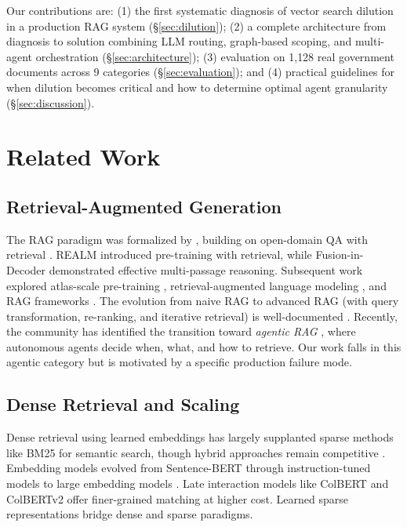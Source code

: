 \documentclass[11pt,a4paper]{article}
\newcommand{\numDocs}{1{,}128}
\begin{document}
Our contributions are: (1) the first systematic diagnosis of vector search dilution in a production RAG system (\S\ref{sec:dilution}); (2) a complete architecture from diagnosis to solution combining LLM routing, graph-based scoping, and multi-agent orchestration (\S\ref{sec:architecture}); (3) evaluation on \numDocs{} real government documents across 9 categories (\S\ref{sec:evaluation}); and (4) practical guidelines for when dilution becomes critical and how to determine optimal agent granularity (\S\ref{sec:discussion}).


\section{Related Work}
\label{sec:related_work}

\subsection{Retrieval-Augmented Generation}

The RAG paradigm was formalized by \citet{lewis2020rag}, building on open-domain QA with retrieval \cite{chen2017drqa, karpukhin2020dpr}. REALM \cite{guu2020realm} introduced pre-training with retrieval, while Fusion-in-Decoder \cite{izacard2021fid} demonstrated effective multi-passage reasoning. Subsequent work explored atlas-scale pre-training \cite{izacard2023atlas}, retrieval-augmented language modeling \cite{borgeaud2022retro}, and RAG frameworks \cite{gao2024ragsurvey, zhao2024ragsurvey2}. The evolution from naive RAG to advanced RAG (with query transformation, re-ranking, and iterative retrieval) is well-documented \cite{gao2024ragsurvey}. Recently, the community has identified the transition toward \textit{agentic RAG} \cite{singh2025agenticrag}, where autonomous agents decide when, what, and how to retrieve. Our work falls in this agentic category but is motivated by a specific production failure mode.

\subsection{Dense Retrieval and Scaling}

Dense retrieval using learned embeddings \cite{karpukhin2020dpr, xiong2021ance} has largely supplanted sparse methods like BM25 \cite{robertson2009bm25} for semantic search, though hybrid approaches remain competitive \cite{chen2024blendedrag, ma2024hybridretrieval}. Embedding models evolved from Sentence-BERT \cite{reimers2019sentencebert} through instruction-tuned models \cite{su2023instructor} to large embedding models \cite{wang2024e5mistral, li2024bge}. Late interaction models like ColBERT \cite{khattab2020colbert} and ColBERTv2 \cite{santhanam2022colbertv2} offer finer-grained matching at higher cost. Learned sparse representations \cite{formal2021splade} bridge dense and sparse paradigms.
\end{document}
